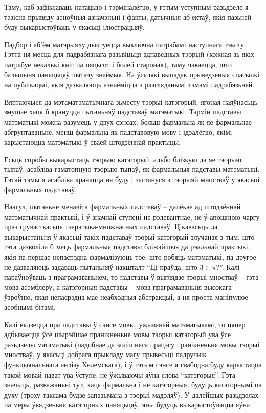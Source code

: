 \documentclass[a4paper,12pt]{book}
\begin{document}
Таму, каб зафіксаваць натацыю і тэрміналёгію, у гэтым уступным разьдзеле
я тэзісна прывяду асноўныя азначэньні і факты, датычныя аб'ектаў, якія
пазьней буду выкарыстоўваць у якасьці ілюстрацыяў.

Падбор і аб'ём матэрыялу дыктуецца выключна патрэбамі наступнага
тэксту. Гэтта ня месца для падрабязнага разьвіцьця адпаведных тэорый
(кожная зь якіх патрабуе некалькі кніг па пяцьсот і болей старонак), таму
чакаецца, што бальшыня паняцьцяў чытачу знаёмыя. На ўсялякі выпадак
прыведзеныя спасылкі на публікацыі, якія дазваляюць азнаёміцца з
разгляданымі тэмамі падрабязьней.

Вяртаючыся да мэтаматэматычнага зьместу тэорыі катэгорый, ягоная
наяўнасьць змушае хаця б крануцца пытаньняў падставаў
матэматыкі. Тэрмін падставы матэматыкі можна разумець у двух сэнсах:
больш фармальна як яе фармальнае абгрунтаваньне, менш фармальна як
падставовую мову і ідэалёгію, якімі карыстаюцца матэматыкі ў сваёй
штодзённай практыцы.

Ёсьць спробы выкарыстаць тэорыю катэгорый, альбо блізкую да яе тэорыю
тыпаў, асабліва гаматопную тэорыю тыпаў, як фармальныя падставы
матэматыкі. Гэтай тэмы я асабліва кранацца ня буду і застануся з тэорыяй
мностваў у якасьці фармальных падставаў.

Наагул, пытаньне менавіта фармальных падставаў -- далёкае ад
штодзённай матэматычнай практыкі, і ў значнай ступені не
рэлевантнае, не ў апошнюю чаргу праз грувасткасьць
тэарэтыка-множнасных падставаў. Цікавасьць да выкарыстаньня ў якасьці
такіх падставаў
тэорыі катэгорый злучаная з тым, што гэта дазволіла б мець фармальныя
падставы бліжэйшыя да рэальнай практыкі, якія па-першае непасрэдна
фармалізуюць тое, што робяць матэматыкі, па-другое не дазваляюць
задаваць пытаньняў накшталт ``Ці праўда, што $3 \in \pi$?''. Калі
параўноўваць з праграмаваньнем, то падставы ў выглядзе тэорыі мностваў
-- гэта мова асэмблеру, а катэгорныя падставы -- мова праграмаваньня
высокага ўзроўню, якая непасрэдна мае неабходныя абстракцыі, а ня
проста маніпулюе асобнымі бітамі.

Калі вядзецца пра падставы ў сэнсе мовы, ужыванай матэматыкамі, то цяпер
адбываецца ўсё шырэйшае пранікненьне мовы тэорыі катэгорый ува ўсе
разьдзелы матэматыкі (падобнае да колішняга працэсу пранікненьня мовы
тэорыі мностваў, у якасьці добрага прыкладу магу прывесьці падручнік
функцыянальнага анлізу Хелемскага), і ў гэтым сэнсе я свабодна буду
карыстацца такой
мовай нават ува ўступе, не ўжываючы яўна слова ``катэгорыя''. Гэта
значыць, разважаньні тут, хаця фармальна і не катэгорныя, будуць
катэгорнымі па духу (троху таксама будзе запазычана з тэорыі
мадэляў). У далейшых разьдзелах па меры ўвядзеньня
катэгорных паняцьцяў, яны будуць выкарыстоўвацца яўна.
\end{document}
